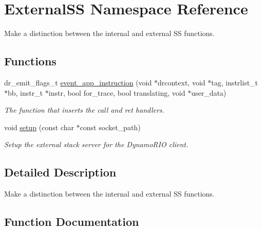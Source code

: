 \hypertarget{namespace_external_s_s}{}\section{External\+SS Namespace Reference}
\label{namespace_external_s_s}


Make a distinction between the internal and external SS functions.  


\subsection*{Functions}
\begin{DoxyCompactItemize}
\item 
dr\+\_\+emit\+\_\+flags\+\_\+t \hyperlink{namespace_external_s_s_a20e2ed7203e7e62d060cd8e020016c69}{event\+\_\+app\+\_\+instruction} (void $\ast$drcontext, void $\ast$tag, instrlist\+\_\+t $\ast$bb, instr\+\_\+t $\ast$instr, bool for\+\_\+trace, bool translating, void $\ast$user\+\_\+data)
\begin{DoxyCompactList}\small\item\em The function that inserts the call and ret handlers. \end{DoxyCompactList}\item 
void \hyperlink{namespace_external_s_s_a1ab997e2712a2124a7056765313589a1}{setup} (const char $\ast$const socket\+\_\+path)
\begin{DoxyCompactList}\small\item\em Setup the external stack server for the Dynamo\+R\+IO client. \end{DoxyCompactList}\end{DoxyCompactItemize}


\subsection{Detailed Description}
Make a distinction between the internal and external SS functions. 

\subsection{Function Documentation}
